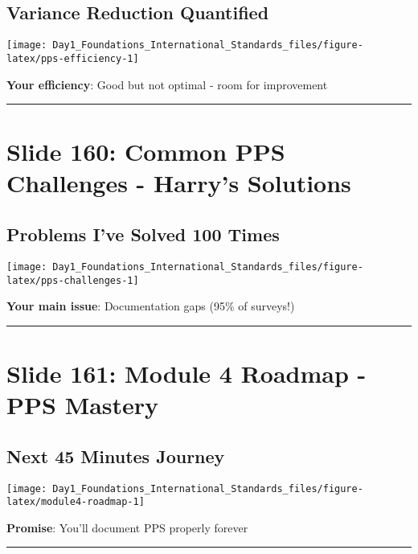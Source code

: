 \documentclass[
]{article}
\begin{document}
\subsection{Variance Reduction
Quantified}\label{variance-reduction-quantified}

\texttt{[image: Day1\_Foundations\_International\_Standards\_files/figure-latex/pps-efficiency-1]}

\textbf{Your efficiency}: Good but not optimal - room for improvement

\begin{center}\rule{0.5\linewidth}{0.5pt}\end{center}

\section{Slide 160: Common PPS Challenges - Harry's
Solutions}\label{slide-160-common-pps-challenges---harrys-solutions}

\subsection{Problems I've Solved 100
Times}\label{problems-ive-solved-100-times}

\texttt{[image: Day1\_Foundations\_International\_Standards\_files/figure-latex/pps-challenges-1]}

\textbf{Your main issue}: Documentation gaps (95\% of surveys!)

\begin{center}\rule{0.5\linewidth}{0.5pt}\end{center}

\section{Slide 161: Module 4 Roadmap - PPS
Mastery}\label{slide-161-module-4-roadmap---pps-mastery}

\subsection{Next 45 Minutes Journey}\label{next-45-minutes-journey}

\texttt{[image: Day1\_Foundations\_International\_Standards\_files/figure-latex/module4-roadmap-1]}

\textbf{Promise}: You'll document PPS properly forever

\begin{center}\rule{0.5\linewidth}{0.5pt}\end{center}
\end{document}
